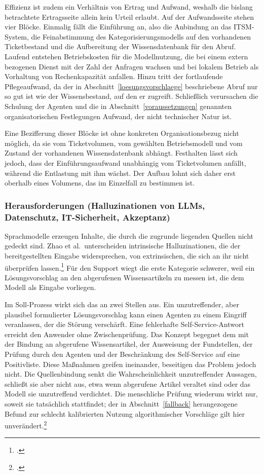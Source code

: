 Effizienz ist zudem ein Verh\"altnis von Ertrag und Aufwand, weshalb die bislang betrachtete Ertragsseite allein kein Urteil erlaubt. Auf der Aufwandsseite stehen vier Bl\"ocke. Einmalig f\"allt die Einf\"uhrung an, also die Anbindung an das ITSM-System, die Feinabstimmung des Kategorisierungsmodells auf den vorhandenen Ticketbestand und die Aufbereitung der Wissensdatenbank f\"ur den Abruf. Laufend entstehen Betriebskosten f\"ur die Modellnutzung, die bei einem extern bezogenen Dienst mit der Zahl der Anfragen wachsen und bei lokalem Betrieb als Vorhaltung von Rechenkapazit\"at anfallen. Hinzu tritt der fortlaufende Pflegeaufwand, da der in Abschnitt~\ref{loesungsvorschlaege} beschriebene Abruf nur so gut ist wie der Wissensbestand, auf den er zugreift. Schlie{\ss}lich verursachen die Schulung der Agenten und die in Abschnitt~\ref{voraussetzungen} genannten organisatorischen Festlegungen Aufwand, der nicht technischer Natur ist.

Eine Bezifferung dieser Bl\"ocke ist ohne konkreten Organisationsbezug nicht m\"oglich, da sie vom Ticketvolumen, vom gew\"ahlten Betriebsmodell und vom Zustand der vorhandenen Wissensdatenbank abh\"angt. Festhalten l\"asst sich jedoch, dass der Einf\"uhrungsaufwand unabh\"angig vom Ticketvolumen anf\"allt, w\"ahrend die Entlastung mit ihm w\"achst. Der Aufbau lohnt sich daher erst oberhalb eines Volumens, das im Einzelfall zu bestimmen ist.

\subsubsection{Herausforderungen (Halluzinationen von LLMs, Datenschutz, IT-Sicherheit, Akzeptanz)}
\label{herausforderungen}

Sprachmodelle erzeugen Inhalte, die durch die zugrunde liegenden Quellen nicht gedeckt sind. Zhao et al.~unterscheiden intrinsische Halluzinationen, die der bereitgestellten Eingabe widersprechen, von extrinsischen, die sich an ihr nicht \"uberpr\"ufen lassen.\footcite[Vgl.][S.~59]{Zhao2023} F\"ur den Support wiegt die erste Kategorie schwerer, weil ein L\"osungsvorschlag an den abgerufenen Wissensartikeln zu messen ist, die dem Modell als Eingabe vorliegen.

Im Soll-Prozess wirkt sich das an zwei Stellen aus. Ein unzutreffender, aber plausibel formulierter L\"osungsvorschlag kann einen Agenten zu einem Eingriff veranlassen, der die St\"orung versch\"arft. Eine fehlerhafte Self-Service-Antwort erreicht den Anwender ohne Zwischenpr\"ufung. Das Konzept begegnet dem mit der Bindung an abgerufene Wissensartikel, der Ausweisung der Fundstellen, der Pr\"ufung durch den Agenten und der Beschr\"ankung des Self-Service auf eine Positivliste. Diese Ma{\ss}nahmen greifen ineinander, beseitigen das Problem jedoch nicht. Die Quellenbindung senkt die Wahrscheinlichkeit unzutreffender Aussagen, schlie{\ss}t sie aber nicht aus, etwa wenn abgerufene Artikel veraltet sind oder das Modell sie unzutreffend verdichtet. Die menschliche Pr\"ufung wiederum wirkt nur, soweit sie tats\"achlich stattfindet; der in Abschnitt~\ref{fallback} herangezogene Befund zur schlecht kalibrierten Nutzung algorithmischer Vorschl\"age gilt hier unver\"andert.\footcite[Vgl.][S.~1]{GreenChen2019}

